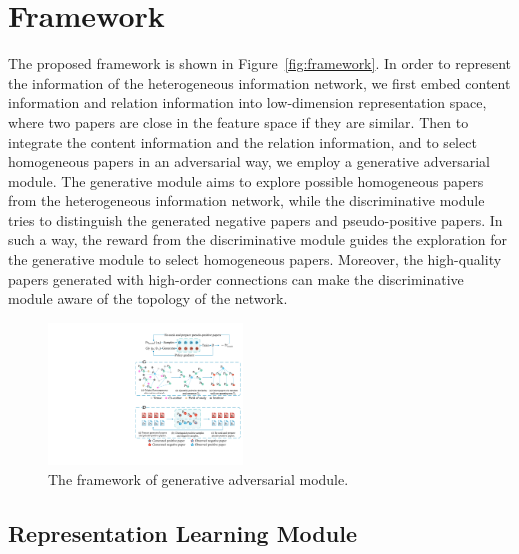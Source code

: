 \documentclass[letterpaper]{article} %
\begin{document}
\section{Framework}

The proposed framework is shown in Figure~\ref{fig:framework}. 
In order to represent the information of the heterogeneous information network, we first embed content information and relation information into low-dimension representation space, where two papers are close in the feature space if they are similar. 
Then to integrate the content information and the relation information, and to select homogeneous papers in an adversarial way, we employ a generative adversarial module. 
The generative module aims to explore possible homogeneous papers from the heterogeneous information network, while the discriminative module tries to distinguish the generated negative papers and pseudo-positive papers. 
In such a way, the reward from the discriminative module guides the exploration for the generative module to select homogeneous papers. Moreover, the high-quality papers generated with high-order connections can make the discriminative module aware of the topology of the network.
\begin{figure}[t]
\centering
\includegraphics[width=0.46\textwidth]{GAN1.pdf}
\caption{The framework of generative adversarial module.}
\label{fig:GAN_framework}
\end{figure}
\subsection{Representation Learning Module}
\end{document}
